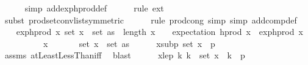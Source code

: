 \begin{isabellebody}
\ \ \ \ \isamarkupfalse%
\ {\isacharparenleft}{\kern0pt}simp\ add{\isacharcolon}{\kern0pt}exp{\isacharunderscore}{\kern0pt}h{\isacharunderscore}{\kern0pt}prod{\isacharunderscore}{\kern0pt}def{\isacharparenright}{\kern0pt}\isanewline
\ \ \ \ \isamarkupfalse%
\ {\isacharparenleft}{\kern0pt}rule\ ext{\isacharparenright}{\kern0pt}\isanewline
\ \ \ \ \isamarkupfalse%
\ {\isacharparenleft}{\kern0pt}subst\ prod{\isachardot}{\kern0pt}set{\isacharunderscore}{\kern0pt}conv{\isacharunderscore}{\kern0pt}list{\isacharbrackleft}{\kern0pt}symmetric{\isacharbrackright}{\kern0pt}{\isacharparenright}{\kern0pt}\isanewline
\ \ \ \ \isamarkupfalse%
\ {\isacharparenleft}{\kern0pt}rule\ prod{\isachardot}{\kern0pt}cong{\isacharcomma}{\kern0pt}\ simp{\isacharcomma}{\kern0pt}\ simp\ add{\isacharcolon}{\kern0pt}comp{\isacharunderscore}{\kern0pt}def{\isacharparenright}{\kern0pt}\isanewline
\isanewline
\ \ \isamarkupfalse%
\ exp{\isacharunderscore}{\kern0pt}h{\isacharunderscore}{\kern0pt}prod{\isacharcolon}{\kern0pt}\ {\isachardoublequoteopen}{\isasymAnd}x{\isachardot}{\kern0pt}\ set\ x\ {\isasymsubseteq}\ set\ as\ {\isasymLongrightarrow}\ length\ x\ {\isasymle}\ {}\ {\isasymLongrightarrow}\ expectation\ {\isacharparenleft}{\kern0pt}h{\isacharunderscore}{\kern0pt}prod\ x{\isacharparenright}{\kern0pt}\ {\isacharequal}{\kern0pt}\ exp{\isacharunderscore}{\kern0pt}h{\isacharunderscore}{\kern0pt}prod\ x{\isachardoublequoteclose}\isanewline
\ \ \isamarkupfalse%
\ {\isacharminus}{\kern0pt}\isanewline
\ \ \ \ \isamarkupfalse%
\ x\ \isanewline
\ \ \ \ \isamarkupfalse%
\ {\isachardoublequoteopen}set\ x\ {\isasymsubseteq}\ set\ as{\isachardoublequoteclose}\isanewline
\ \ \ \ \isamarkupfalse%
\ x{\isacharunderscore}{\kern0pt}sub{\isacharunderscore}{\kern0pt}p{\isacharcolon}{\kern0pt}\ {\isachardoublequoteopen}set\ x\ {\isasymsubseteq}\ {\isacharbraceleft}{\kern0pt}{}{\isachardot}{\kern0pt}{\isachardot}{\kern0pt}{\isacharless}{\kern0pt}p{\isacharbraceright}{\kern0pt}{\isachardoublequoteclose}\ \isamarkupfalse%
\ assms{\isacharparenleft}{\kern0pt}{}{\isacharparenright}{\kern0pt}\ atLeastLessThan{\isacharunderscore}{\kern0pt}iff\ \isamarkupfalse%
\ blast\isanewline
\ \ \ \ \isamarkupfalse%
\ x{\isacharunderscore}{\kern0pt}le{\isacharunderscore}{\kern0pt}p{\isacharcolon}{\kern0pt}\ {\isachardoublequoteopen}{\isasymAnd}k{\isachardot}{\kern0pt}\ k\ {\isasymin}\ set\ x\ {\isasymLongrightarrow}\ k\ {\isacharless}{\kern0pt}\ p{\isachardoublequoteclose}\ \isamarkupfalse%

\end{isabellebody}
